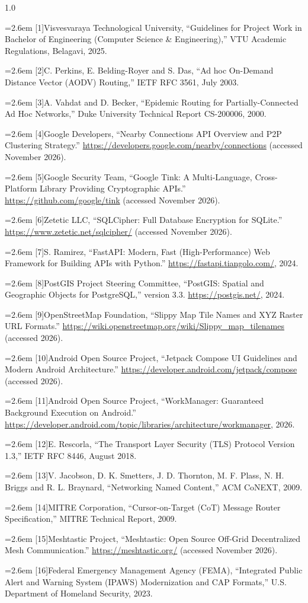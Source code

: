 \documentclass[12pt,a4paper]{report}
\newcommand{\refitem}[2]{\par\noindent\hangindent=2.6em\hangafter=1 [#1]\hspace{0.9em}#2\par\vspace{2pt}}
\begin{document}
\begin{spacing}{1.0}
\small
\refitem{1}{Visvesvaraya Technological University, ``Guidelines for Project Work in Bachelor of Engineering (Computer Science \& Engineering),'' VTU Academic Regulations, Belagavi, 2025.}
\refitem{2}{C. Perkins, E. Belding-Royer and S. Das, ``Ad hoc On-Demand Distance Vector (AODV) Routing,'' IETF RFC 3561, July 2003.}
\refitem{3}{A. Vahdat and D. Becker, ``Epidemic Routing for Partially-Connected Ad Hoc Networks,'' Duke University Technical Report CS-200006, 2000.}
\refitem{4}{Google Developers, ``Nearby Connections API Overview and P2P Clustering Strategy.'' \url{https://developers.google.com/nearby/connections} (accessed November 2026).}
\refitem{5}{Google Security Team, ``Google Tink: A Multi-Language, Cross-Platform Library Providing Cryptographic APIs.'' \url{https://github.com/google/tink} (accessed November 2026).}
\refitem{6}{Zetetic LLC, ``SQLCipher: Full Database Encryption for SQLite.'' \url{https://www.zetetic.net/sqlcipher/} (accessed November 2026).}
\refitem{7}{S. Ramirez, ``FastAPI: Modern, Fast (High-Performance) Web Framework for Building APIs with Python.'' \url{https://fastapi.tiangolo.com/}, 2024.}
\refitem{8}{PostGIS Project Steering Committee, ``PostGIS: Spatial and Geographic Objects for PostgreSQL,'' version 3.3. \url{https://postgis.net/}, 2024.}
\refitem{9}{OpenStreetMap Foundation, ``Slippy Map Tile Names and XYZ Raster URL Formats.'' \url{https://wiki.openstreetmap.org/wiki/Slippy_map_tilenames} (accessed 2026).}
\refitem{10}{Android Open Source Project, ``Jetpack Compose UI Guidelines and Modern Android Architecture.'' \url{https://developer.android.com/jetpack/compose} (accessed 2026).}
\refitem{11}{Android Open Source Project, ``WorkManager: Guaranteed Background Execution on Android.'' \url{https://developer.android.com/topic/libraries/architecture/workmanager}, 2026.}
\refitem{12}{E. Rescorla, ``The Transport Layer Security (TLS) Protocol Version 1.3,'' IETF RFC 8446, August 2018.}
\refitem{13}{V. Jacobson, D. K. Smetters, J. D. Thornton, M. F. Plass, N. H. Briggs and R. L. Braynard, ``Networking Named Content,'' ACM CoNEXT, 2009.}
\refitem{14}{MITRE Corporation, ``Cursor-on-Target (CoT) Message Router Specification,'' MITRE Technical Report, 2009.}
\refitem{15}{Meshtastic Project, ``Meshtastic: Open Source Off-Grid Decentralized Mesh Communication.'' \url{https://meshtastic.org/} (accessed November 2026).}
\refitem{16}{Federal Emergency Management Agency (FEMA), ``Integrated Public Alert and Warning System (IPAWS) Modernization and CAP Formats,'' U.S. Department of Homeland Security, 2023.}

\end{spacing}
\end{document}
